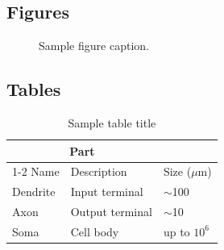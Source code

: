 \subsection{Figures}
\lipsum[10]
\begin{figure}
	\centering
	\fbox{\rule[-.5cm]{4cm}{4cm} \rule[-.5cm]{4cm}{0cm}}
	\caption{Sample figure caption.}
	\label{fig:fig1}
\end{figure}

\subsection{Tables}
\begin{table}
	\caption{Sample table title}
	\centering
	\begin{tabular}{lll}
		\toprule
		\multicolumn{2}{c}{Part} \\
		\cmidrule(r){1-2}
		Name     & Description     & Size ($\mu$m) \\
		\midrule
		Dendrite & Input terminal  & $\sim$100     \\
		Axon     & Output terminal & $\sim$10      \\
		Soma     & Cell body       & up to $10^6$  \\
		\bottomrule
	\end{tabular}
	\label{tab:table}
\end{table}



